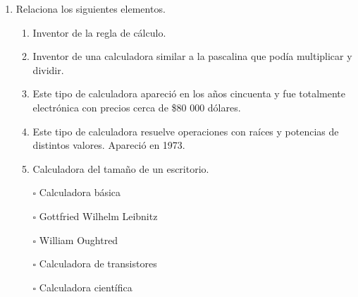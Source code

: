 \documentclass[11pt]{book}
\begin{document}
\begin{enumerate}
\begin{enumerate}
        \end{enumerate}

  \item Relaciona los siguientes elementos.

        \begin{minipage}{0.45\linewidth}
          \begin{enumerate}
            \item Inventor de la regla de c\'alculo.
            \item Inventor de una calculadora similar a la pascalina que pod\'ia
                  multiplicar y dividir.
            \item Este tipo de calculadora apareci\'o en los años cincuenta y fue
                  totalmente electr\'onica con precios cerca de \$80 000 d\'olares.
            \item Este tipo de calculadora resuelve operaciones con ra\'ices y
                  potencias de distintos valores. Apareci\'o en 1973.
            \item Calculadora del tamaño de un escritorio.
          \end{enumerate}
        \end{minipage}\hfill
        \begin{minipage}{0.4\linewidth}
          \begin{itemize}
            \item[\Huge$\square$] Calculadora b\'asica \vspace{0.5cm}
            \item[\Huge$\square$] Gottfried Wilhelm Leibnitz  \vspace{0.5cm}
            \item[\Huge$\square$] William Oughtred	  \vspace{0.5cm}
            \item[\Huge$\square$] Calculadora de transistores    \vspace{0.5cm}
            \item[\Huge$\square$] Calculadora cient\'ifica   \vspace{0.5cm}
          \end{itemize}


\end{minipage}
\end{enumerate}
\end{document}

